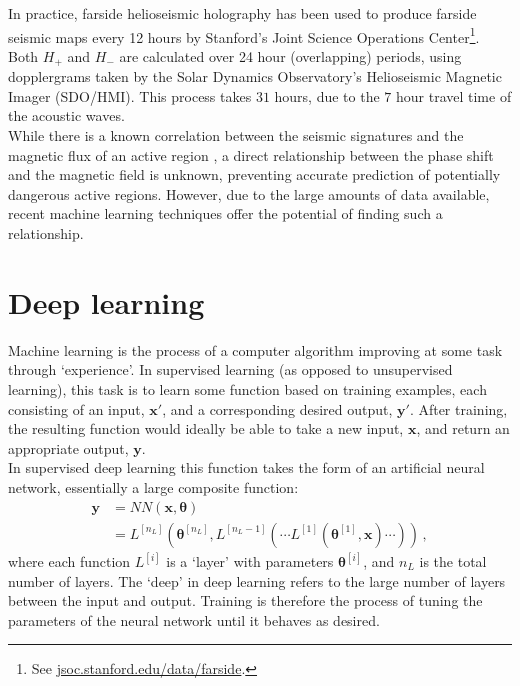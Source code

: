 \documentclass[11pt,a4paper,onecolumn]{report}
\begin{document}
In practice, farside helioseismic holography has been used to produce farside
seismic maps every 12 hours by Stanford's Joint Science Operations
Center\footnote{See \url{jsoc.stanford.edu/data/farside}.}. Both \(H_+\)
and \(H_-\) are calculated over 24 hour (overlapping) periods, using
dopplergrams taken by the Solar Dynamics Observatory's Helioseismic
Magnetic Imager (SDO/HMI). This process takes \(31 \) hours, due to the \(7\) hour
travel time of the acoustic waves. \\


While there is a known correlation between the seismic signatures and the
magnetic flux of an active region \citep{Gonzalez_Hernandez_2007}, a direct relationship
between the phase shift and the magnetic field is unknown, preventing accurate
prediction of potentially dangerous active regions. However, due to the large amounts of data
available, recent machine learning techniques offer the potential of finding
such a relationship.



%
%
\section{Deep learning}
%
%

\label{sec: deep learning}
Machine learning is the process of a computer algorithm improving at some task
through `experience'. In supervised learning (as opposed to unsupervised
learning), this task is to learn some function based on training examples,
each consisting of an input, \(\bm{x'}\), and a corresponding desired output,
\(\bm{y'}\). After training, the resulting function would ideally be able to
take a new input, \(\bm{x}\), and return an appropriate output, \(\bm{y}\). \\

In supervised deep learning this function takes the form of an artificial neural
network, essentially a large composite function:
\begin{align}
  \bm{y} &= NN(\bm{x}, \bm{\theta})\\
  &= L^{[n_L]}(\bm{\theta}^{[n_L]}, L^{[n_L-1]}( \dotsm L^{[1]}(\bm{\theta}^{[1]}, \bm{x}) \dotsm ))\,, 
\end{align}
where each function \(L^{[i]}\) is a `layer' with parameters
\(\bm{\theta}^{[i]}\), and \(n_L\) is the total number of layers. The `deep' in deep
learning refers to the large number of layers between the input and output.
Training is therefore the process of tuning the parameters of the neural
network until it behaves as desired. \\
\end{document}
